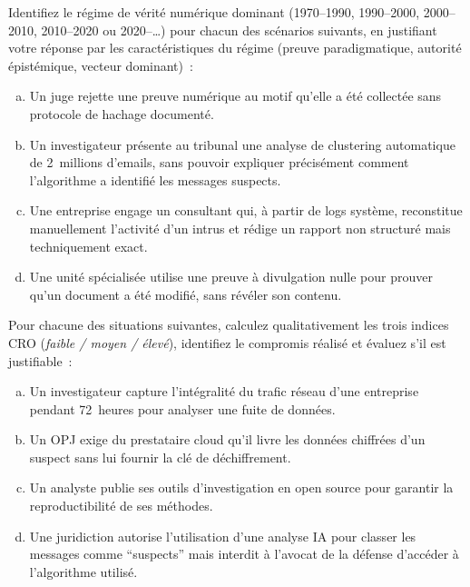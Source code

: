 \bigskip

\begin{boxexo}[title={\ding{45}\quad Exercice~1.1 --- Diagnostic de régime \niveaubase}]
Identifiez le régime de vérité numérique dominant (1970--1990,
1990--2000, 2000--2010, 2010--2020 ou 2020--\ldots) pour chacun des
scénarios suivants, en justifiant votre réponse par les caractéristiques
du régime (preuve paradigmatique, autorité épistémique, vecteur dominant)~:

\begin{enumerate}[(a)]
    \item Un juge rejette une preuve numérique au motif qu'elle a été
          collectée sans protocole de hachage documenté.
    \item Un investigateur présente au tribunal une analyse de clustering
          automatique de 2~millions d'emails, sans pouvoir expliquer
          précisément comment l'algorithme a identifié les messages suspects.
    \item Une entreprise engage un consultant qui, à partir de logs système,
          reconstitue manuellement l'activité d'un intrus et rédige
          un rapport non structuré mais techniquement exact.
    \item Une unité spécialisée utilise une preuve à divulgation nulle
          pour prouver qu'un document a été modifié, sans révéler son contenu.
\end{enumerate}
\end{boxexo}

\begin{boxexo}[title={\ding{45}\quad Exercice~1.2 --- Application du Trilemme CRO \niveaumoyen}]
Pour chacune des situations suivantes, calculez qualitativement les trois
indices CRO (\textit{faible / moyen / élevé}), identifiez le compromis
réalisé et évaluez s'il est justifiable~:

\begin{enumerate}[(a)]
    \item Un investigateur capture l'intégralité du trafic réseau d'une
          entreprise pendant 72~heures pour analyser une fuite de données.
    \item Un OPJ exige du prestataire cloud qu'il livre les données chiffrées
          d'un suspect sans lui fournir la clé de déchiffrement.
    \item Un analyste publie ses outils d'investigation en open source pour
          garantir la reproductibilité de ses méthodes.
    \item Une juridiction autorise l'utilisation d'une analyse IA pour
          classer les messages comme ``suspects'' mais interdit à l'avocat
          de la défense d'accéder à l'algorithme utilisé.
\end{enumerate}
\end{boxexo}

